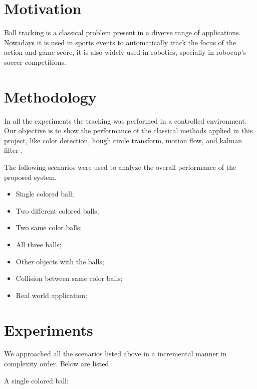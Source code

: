\documentclass{sciposter}
\begin{document}
\begin{multicols}{3}


\section{Motivation}

Ball tracking is a classical problem present in a diverse range of applications. Nowadays it is used in sports events to automatically track the focus of the action and game score, it is also widely used in robotics, specially in robocup's soccer competitions.

\section{Methodology}

In all the experiments the tracking was performed in a controlled environment. Our objective is to show the performance of the classical methods applied in this project, like color detection, hough circle transform, motion flow, and kalman filter .

\bigbreak

The following scenarios were used to analyze the overall performance of the proposed system.

\begin{itemize}

\item Single colored ball;
\item Two different colored balls;
\item Two same color balls;
\item All three balls;
\item Other objects with the balls;
\item Collision between same color balls;
\item Real world application;

\end{itemize}

\section{Experiments}

We approached all the scenarios listed above in a incremental manner in complexity order. Below are listed

\bigbreak
A single colored ball:


\end{multicols}
\end{document}
